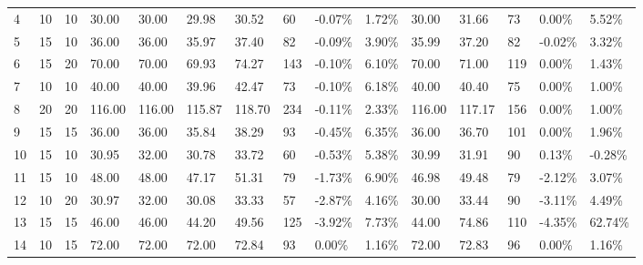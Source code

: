 \documentclass[
  a4paper,
,tablecaptionabove
]{scrartcl}
\begin{document}
\begin{longtable}{l|ll|ll|lllll|lllll}
  4  & 10                         & 10                         & 30.00                     & 30.00       & 29.98         & 30.52  & 60  & -0.07\% & 1.72\% & 30.00  & 31.66  & 73  & 0.00\%  & 5.52\%  \\
  5  & 15                         & 10                         & 36.00                     & 36.00       & 35.97         & 37.40  & 82  & -0.09\% & 3.90\% & 35.99  & 37.20  & 82  & -0.02\% & 3.32\%  \\
  6  & 15                         & 20                         & 70.00                     & 70.00       & 69.93         & 74.27  & 143 & -0.10\% & 6.10\% & 70.00  & 71.00  & 119 & 0.00\%  & 1.43\%  \\
  7  & 10                         & 10                         & 40.00                     & 40.00       & 39.96         & 42.47  & 73  & -0.10\% & 6.18\% & 40.00  & 40.40  & 75  & 0.00\%  & 1.00\%  \\
  8  & 20                         & 20                         & 116.00                    & 116.00      & 115.87        & 118.70 & 234 & -0.11\% & 2.33\% & 116.00 & 117.17 & 156 & 0.00\%  & 1.00\%  \\
  9  & 15                         & 15                         & 36.00                     & 36.00       & 35.84         & 38.29  & 93  & -0.45\% & 6.35\% & 36.00  & 36.70  & 101 & 0.00\%  & 1.96\%  \\
  10 & 15                         & 10                         & 30.95                     & 32.00       & 30.78         & 33.72  & 60  & -0.53\% & 5.38\% & 30.99  & 31.91  & 90  & 0.13\%  & -0.28\% \\
  11 & 15                         & 10                         & 48.00                     & 48.00       & 47.17         & 51.31  & 79  & -1.73\% & 6.90\% & 46.98  & 49.48  & 79  & -2.12\% & 3.07\%  \\
  12 & 10                         & 20                         & 30.97                     & 32.00       & 30.08         & 33.33  & 57  & -2.87\% & 4.16\% & 30.00  & 33.44  & 90  & -3.11\% & 4.49\%  \\
  13 & 15                         & 15                         & 46.00                     & 46.00       & 44.20         & 49.56  & 125 & -3.92\% & 7.73\% & 44.00  & 74.86  & 110 & -4.35\% & 62.74\% \\
  14 & 10                         & 15                         & 72.00                     & 72.00       & 72.00         & 72.84  & 93  & 0.00\%  & 1.16\% & 72.00  & 72.83  & 96  & 0.00\%  & 1.16\%  \\

\end{longtable}
\end{document}

